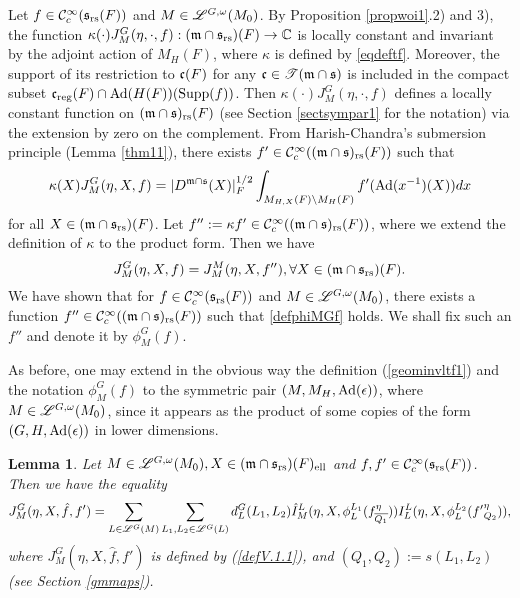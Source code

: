 \documentclass[a4paper]{amsart}
\newcommand{\fm}{{\mathfrak{m}}} \newcommand{\fn}{{\mathfrak{n}}}\newcommand{\fo}{{\mathfrak{o}}} \newcommand{\fp}{{\mathfrak{p}}}
\newcommand{\ov}{\overline}
\newtheorem{lem}[thm]{Lemma}
\theoremstyle{definition}
\theoremstyle{remark}
\numberwithin{equation}{subsection}
\begin{document}
Let $f\in{\mathcal {C}}_c^\infty({\mathfrak{s}}_{\mathrm{rs}}(F))$ and $M\in\mathscr{L}^{G,\omega}(M_0)$. By Proposition \ref{propwoi1}.2) and 3), the function $\kappa(\cdot)J_M^G(\eta, \cdot, f): (\fm\cap\fs_\rs)(F)\ra\BC$ is locally constant and invariant by the adjoint action of $M_H(F)$, where $\kappa$ is defined by \eqref{eqdeftf}. Moreover, the support of its restriction to ${\mathfrak{c}}(F)$ for any $\fc\in\mst(\fm\cap\fs)$ is included in the compact subset ${\mathfrak{c}}_{\mathrm{reg}}(F)\cap{\mathrm{Ad}}(H(F))({\mathrm{Supp}}(f))$. Then $\kappa(\cdot)J_M^G(\eta, \cdot, f)$ defines a locally constant function on $(\fm\cap\fs)_\rs(F)$ (see Section \ref{sectsympar1} for the notation) via the extension by zero on the complement. From Harish-Chandra's submersion principle (Lemma \ref{thm11}), there exists $f'\in\CC_c^\infty((\fm\cap\fs)_\rs(F))$ such that
$$ \kappa(X)J_M^G(\eta, X, f)=|D^{\fm\cap\fs}(X)|_F^{1/2}\int_{M_{H,X}(F)\bs M_H(F)}f'(\Ad(x^{-1})(X))dx $$
for all $X\in(\fm\cap\fs_\rs)(F)$. Let $f'':=\kappa f'\in\CC_c^\infty((\fm\cap\fs)_\rs(F))$, where we extend the definition of $\kappa$ to the product form. Then we have
\begin{equation}\label{defphiMGf}
 J_M^G(\eta, X, f)=J_M^M(\eta, X, f''), \forall X\in(\fm\cap\fs_\rs)(F). 
\end{equation}
We have shown that for $f\in{\mathcal {C}}_c^\infty({\mathfrak{s}}_{\mathrm{rs}}(F))$ and $M\in\mathscr{L}^{G,\omega}(M_0)$, there exists a function $f''\in\CC_c^\infty((\fm\cap\fs)_\rs(F))$ such that \eqref{defphiMGf} holds. We shall fix such an $f''$ and denote it by $\phi_M^G(f)$. 

As before, one may extend in the obvious way the definition (\ref{geominvltf1}) and the notation $\phi_M^G(f)$ to the symmetric pair $(M, M_H, {\mathrm{Ad}}(\epsilon))$, where $M\in\mathscr{L}^{G,\omega}(M_0)$, since it appears as the product of some copies of the form $(G, H, {\mathrm{Ad}}(\epsilon))$ in lower dimensions. 

\begin{lem}\label{lemVII.2}
Let $M\in\msl^{G,\omega}(M_0), X\in(\fm\cap\fs_\rs)(F)_\el$ and $f,f'\in{\mathcal {C}}_c^\infty({\mathfrak{s}}_{\mathrm{rs}}(F))$. Then we have the equality
\begin{equation}\label{equlemVII.2}
 J_M^G(\eta, X, \hat{f}, f')=\sum_{L\in\msl^G(M)} \sum_{L_1,L_2\in\msl^G(L)} d_L^G(L_1,L_2) \hat{I}_M^L(\eta, X, \phi_L^{L_1}(f_{\ov{Q_1}}^\eta)) I_L^L(\eta, X,\phi_L^{L_2}({f'}_{Q_2}^\eta)), 
\end{equation}
where $J_M^G(\eta, X, \hat{f}, f')$ is defined by (\ref{defV.1.1}), and $(Q_1,Q_2):=s(L_1,L_2)$ (see Section \ref{gmmaps}). 
\end{lem}
\end{document}
